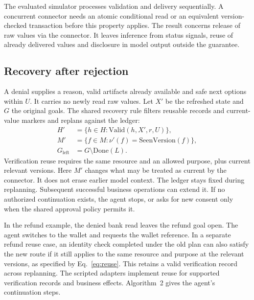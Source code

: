 The evaluated simulator processes validation and delivery sequentially. A concurrent connector needs an atomic conditional read or an equivalent version-checked transaction before this property applies. The result concerns release of raw values via the connector. It leaves inference from status signals, reuse of already delivered values and disclosure in model output outside the guarantee.

\subsection{Recovery after rejection}
A denial supplies a reason, valid artifacts already available and safe next options within $U$. It carries no newly read raw values. Let $X'$ be the refreshed state and $G$ the original goals. The shared recovery rule filters reusable records and current-value markers and replans against the ledger:
\begin{align}
H' &= \{h\in H : \mathrm{Valid}(h,X',r,U)\},\label{eq:reuse}\\
M' &= \{f\in M : \nu'(f)=\mathrm{SeenVersion}(f)\},\label{eq:seen}\\
G_{\mathrm{left}} &= G\setminus\mathrm{Done}(L).\label{eq:remaining}
\end{align}
Verification reuse requires the same resource and an allowed purpose, plus current relevant versions. Here $M'$ changes what may be treated as current by the connector. It does not erase earlier model context. The ledger stays fixed during replanning. Subsequent successful business operations can extend it. If no authorized continuation exists, the agent stops, or asks for new consent only when the shared approval policy permits it.

In the refund example, the denied bank read leaves the refund goal open. The agent switches to the wallet and requests the wallet reference. In a separate refund reuse case, an identity check completed under the old plan can also satisfy the new route if it still applies to the same resource and purpose at the relevant versions, as specified by Eq.~\eqref{eq:reuse}. This retains a valid verification record across replanning. The scripted adapters implement reuse for supported verification records and business effects. Algorithm~2 gives the agent's continuation steps.

